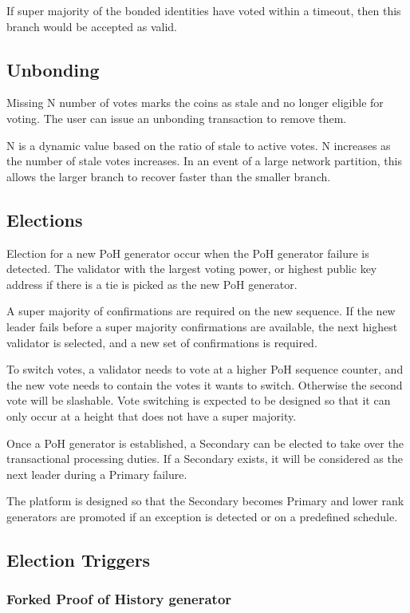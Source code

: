 \documentclass[12pt]{article}
\begin{document}
If super majority of the bonded identities have voted within a timeout, then this branch would be accepted as valid.

\subsection{Unbonding}

Missing N number of votes marks the coins as stale and no longer eligible for voting. The user can issue an unbonding transaction to remove them.

N is a dynamic value based on the ratio of stale to active votes. N increases as the number of stale votes increases. In an event of a large network partition, this allows the larger branch to recover faster than the smaller branch.

\subsection{Elections}\label{subsec:elections}
Election for a new PoH generator occur when the PoH generator failure is detected. The validator with the largest voting power, or highest public key address if there is a tie is picked as the new PoH generator.

A super majority of confirmations are required on the new sequence. If the new leader fails before a super majority confirmations are available, the next highest validator is selected, and a new set of confirmations is required.

To switch votes, a validator needs to vote at a higher PoH sequence counter, and the new vote needs to contain the votes it wants to switch. Otherwise the second vote will be slashable. Vote switching is expected to be designed so that it can only occur at a height that does not have a super majority.

Once a PoH generator is established, a Secondary can be elected to take over the transactional processing duties. If a Secondary exists, it will be considered as the next leader during a Primary failure.

The platform is designed so that the Secondary becomes Primary and lower rank generators are promoted if an exception is detected or on a predefined schedule.
\subsection{Election Triggers}
\subsubsection{Forked Proof of History generator}
\end{document}

